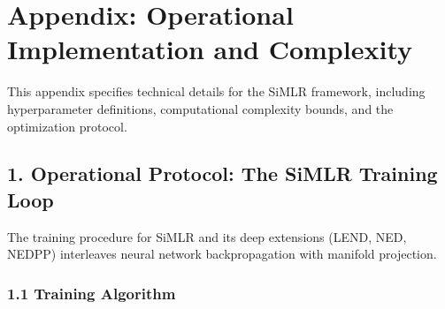 \documentclass[
  letterpaper,
]{report}
\begin{document}
\chapter{Appendix: Operational Implementation and
Complexity}\label{appendix-operational-implementation-and-complexity}

This appendix specifies technical details for the SiMLR framework,
including hyperparameter definitions, computational complexity bounds,
and the optimization protocol.

\section{1. Operational Protocol: The SiMLR Training
Loop}\label{operational-protocol-the-simlr-training-loop}

The training procedure for SiMLR and its deep extensions (LEND, NED,
NEDPP) interleaves neural network backpropagation with manifold
projection.

\subsection{1.1 Training Algorithm}\label{training-algorithm}
\end{document}
